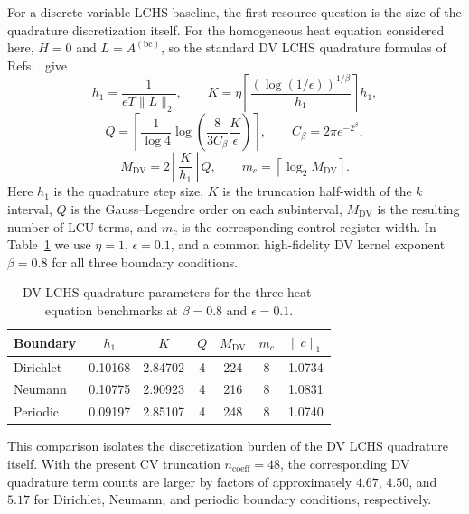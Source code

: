 For a discrete-variable LCHS baseline, the first resource question is the size of the quadrature discretization itself. For the homogeneous heat equation considered here, $H=0$ and $L=A^{(\mathrm{bc})}$, so the standard DV LCHS quadrature formulas of Refs.~\cite{LCHS1,LCHS2} give
\[
h_1=\frac{1}{eT\|L\|_2},\qquad
K=\eta\left\lceil \frac{(\log(1/\epsilon))^{1/\beta}}{h_1}\right\rceil h_1,
\]
\[
Q=
\left\lceil
\frac{1}{\log 4}
\log\!\left(
\frac{8}{3C_\beta}\frac{K}{\epsilon}
\right)
\right\rceil,
\qquad
C_\beta = 2\pi e^{-2^\beta},
\]
\[
M_{\mathrm{DV}} = 2\left\lfloor \frac{K}{h_1}\right\rfloor Q,
\qquad
m_c = \left\lceil \log_2 M_{\mathrm{DV}}\right\rceil .
\]
Here $h_1$ is the quadrature step size, $K$ is the truncation half-width of the $k$ interval, $Q$ is the Gauss--Legendre order on each subinterval, $M_{\mathrm{DV}}$ is the resulting number of LCU terms, and $m_c$ is the corresponding control-register width. In Table~\ref{tab:dv_resource_compare} we use $\eta=1$, $\epsilon=0.1$, and a common high-fidelity DV kernel exponent $\beta=0.8$ for all three boundary conditions.

\begin{table}[t]
\centering
{\small
\caption{DV LCHS quadrature parameters for the three heat-equation benchmarks at $\beta=0.8$ and $\epsilon=0.1$.}
\label{tab:dv_resource_compare}
\begin{tabular}{lcccccc}
\toprule
Boundary & $h_1$ & $K$ & $Q$ & $M_{\mathrm{DV}}$ & $m_c$ & $\|c\|_1$ \\
\midrule
Dirichlet & 0.10168 & 2.84702 & 4 & 224 & 8 & 1.0734 \\
Neumann & 0.10775 & 2.90923 & 4 & 216 & 8 & 1.0831 \\
Periodic & 0.09197 & 2.85107 & 4 & 248 & 8 & 1.0740 \\
\bottomrule
\end{tabular}}
\end{table}

This comparison isolates the discretization burden of the DV LCHS quadrature itself. With the present CV truncation $n_{\mathrm{coeff}}=48$, the corresponding DV quadrature term counts are larger by factors of approximately $4.67$, $4.50$, and $5.17$ for Dirichlet, Neumann, and periodic boundary conditions, respectively.

